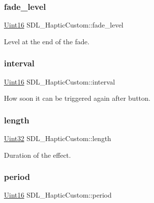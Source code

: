 \subsubsection{\texorpdfstring{fade\+\_\+level}{fade\_level}}
{\footnotesize\ttfamily \hyperlink{_s_d_l__stdinc_8h_a31fcc0a076c9068668173ee26d33e42b}{Uint16} S\+D\+L\+\_\+\+Haptic\+Custom\+::fade\+\_\+level}

Level at the end of the fade. \mbox{\label{struct_s_d_l___haptic_custom_afdeb26b1709254545e00a59a0a6c360c}} 
\subsubsection{\texorpdfstring{interval}{interval}}
{\footnotesize\ttfamily \hyperlink{_s_d_l__stdinc_8h_a31fcc0a076c9068668173ee26d33e42b}{Uint16} S\+D\+L\+\_\+\+Haptic\+Custom\+::interval}

How soon it can be triggered again after button. \mbox{\label{struct_s_d_l___haptic_custom_ad70e8bc2cff74b99d704a757c16b363f}} 
\subsubsection{\texorpdfstring{length}{length}}
{\footnotesize\ttfamily \hyperlink{_s_d_l__stdinc_8h_add440eff171ea5f55cb00c4a9ab8672d}{Uint32} S\+D\+L\+\_\+\+Haptic\+Custom\+::length}

Duration of the effect. \mbox{\label{struct_s_d_l___haptic_custom_aba7fafa808e90baddef25f009b8f4817}} 
\subsubsection{\texorpdfstring{period}{period}}
{\footnotesize\ttfamily \hyperlink{_s_d_l__stdinc_8h_a31fcc0a076c9068668173ee26d33e42b}{Uint16} S\+D\+L\+\_\+\+Haptic\+Custom\+::period}

